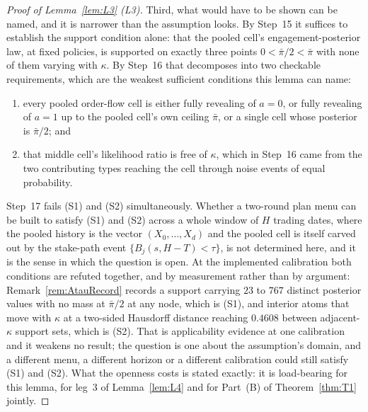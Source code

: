 \documentclass[11pt]{article}
\begin{document}
\begin{proof}[Proof of Lemma~\ref{lem:L3} (L3)]
Third, what would have to be shown can be named, and it is narrower than the assumption looks. By
Step~15 it suffices to establish the support condition alone: that the pooled cell's
engagement-posterior law, at fixed policies, is supported on exactly three points
$0 < \bar\pi/2 < \bar\pi$ with none of them varying with $\kappa$. By Step~16 that decomposes into
two checkable requirements, which are the weakest sufficient conditions this lemma can name:
\begin{enumerate}[label=(S\arabic*),leftmargin=3.2em,itemsep=3pt]
\item every pooled order-flow cell is either fully revealing of $a=0$, or fully revealing of $a=1$ up
  to the pooled cell's own ceiling $\bar\pi$, or a single cell whose posterior is $\bar\pi/2$; and
\item that middle cell's likelihood ratio is free of $\kappa$, which in Step~16 came from the two
  contributing types reaching the cell through noise events of equal probability.
\end{enumerate}
Step~17 fails (S1) and (S2) simultaneously. Whether a two-round plan menu can be built to satisfy
(S1) and (S2) across a whole window of $H$ trading dates, where the pooled history is the vector
$(X_0,\dots,X_d)$ and the pooled cell is itself carved out by the stake-path event
$\{B_j(s,H-T)<\tau\}$, is not determined here, and it is the sense in which the question is open.
At the implemented calibration both conditions are refuted together, and by measurement rather than
by argument: Remark~\ref{rem:AtauRecord} records a support carrying $23$ to $767$ distinct posterior
values with no mass at $\bar\pi/2$ at any node, which is (S1), and interior atoms that move with
$\kappa$ at a two-sided Hausdorff distance reaching $0.4608$ between adjacent-$\kappa$ support sets,
which is (S2). That is applicability evidence at one calibration and it weakens no result; the
question is one about the assumption's domain, and a different menu, a different horizon or a different
calibration could still satisfy (S1) and (S2). What the openness costs is stated exactly: it is
load-bearing for this lemma, for leg~3 of Lemma~\ref{lem:L4} and for Part~(B) of
Theorem~\ref{thm:T1} jointly.
\end{proof}
\end{document}
